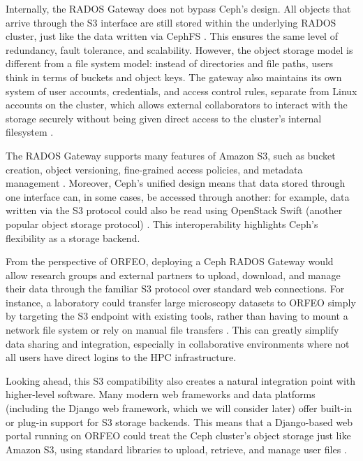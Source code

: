 \medskip

Internally, the RADOS Gateway does not bypass Ceph’s design. All objects that 
arrive through the S3 interface are still stored within the underlying RADOS 
cluster, just like the data written via CephFS \parencite{Ceph_RGW_Overview}. This 
ensures the same level of redundancy, fault tolerance, and scalability. However, 
the object storage model is different from a file system model: instead of 
directories and file paths, users think in terms of buckets and object keys. The 
gateway also maintains its own system of user accounts, credentials, and access 
control rules, separate from Linux accounts on the cluster, which allows 
external collaborators to interact with the storage securely without being given 
direct access to the cluster’s internal 
filesystem \parencite{Ceph_RGW_Overview,Ceph_RGW_S3}.

\medskip

The RADOS Gateway supports many features of Amazon S3, such as bucket creation, 
object versioning, fine-grained access policies, and metadata 
management \parencite{Ceph_RGW_S3}. Moreover, Ceph’s unified design means that 
data stored through one interface can, in some cases, be accessed through 
another: for example, data written via the S3 protocol could also be read using 
OpenStack Swift (another popular object storage 
protocol) \parencite{Ceph_RGW_Overview}. This interoperability highlights Ceph’s 
flexibility as a storage backend.

\medskip

From the perspective of ORFEO, deploying a Ceph RADOS Gateway would allow 
research groups and external partners to upload, download, and manage their data 
through the familiar S3 protocol over standard web connections. For instance, a 
laboratory could transfer large microscopy datasets to ORFEO simply by 
targeting the S3 endpoint with existing tools, rather than having to mount a 
network file system or rely on manual file 
transfers \parencite{Ceph_RGW_S3}. This can greatly simplify data sharing and 
integration, especially in collaborative environments where not all users have 
direct logins to the HPC infrastructure.

\medskip

Looking ahead, this S3 compatibility also creates a natural integration point 
with higher-level software. Many modern web frameworks and data platforms 
(including the Django web framework, which we will consider later) offer 
built-in or plug-in support for S3 storage backends. This means that a 
Django-based web portal running on ORFEO could treat the Ceph cluster’s object 
storage just like Amazon S3, using standard libraries to upload, retrieve, and 
manage user files \parencite{Ceph_RGW_S3,Ceph_RGW_Overview}.

